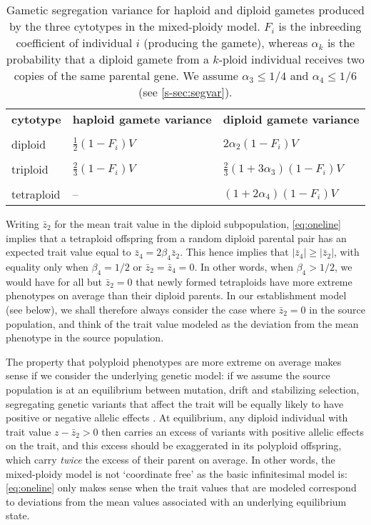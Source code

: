\documentclass[12pt,a4paper]{article}
\begin{document}
\begin{table}[t]
\caption{Gametic segregation variance for haploid and diploid gametes produced
by the three cytotypes in the mixed-ploidy model. $F_i$ is the inbreeding
coefficient of individual $i$ (producing the gamete), whereas $\alpha_k$ is the
probability that a diploid gamete from a $k$-ploid individual receives two
copies of the same parental gene. We assume $\alpha_3 \le 1/4$ and
    $\alpha_4 \le 1/6$ (see \cref{s-sec:segvar}).
} \label{tbl:segvar}
\centering
\small
\begin{tabularx}{\linewidth}{XXX}
\cline{1-3}
\textbf{cytotype}   & \textbf{haploid gamete variance} & \textbf{diploid gamete
variance}        \\ \cline{1-3} \\[-2.5ex]
diploid    & $\frac{1}{2}(1-F_i)V$    & $2\alpha_2(1-F_i)V$  \\ \\[-2.5ex]
triploid   & $\frac{2}{3}(1-F_i)V$     & $\frac{2}{3}(1 + 3\alpha_3)(1-F_i)V$ \\ \\[-2.5ex]
tetraploid & --                      & $(1+2\alpha_4)(1-F_i)V$             \\
\cline{1-3}
\end{tabularx}%
\end{table}

Writing $\bar{z}_2$ for the mean trait value in the diploid subpopulation,
\cref{eq:oneline} implies that a tetraploid offspring from a random diploid
parental pair has an expected trait value equal to $\bar{z}_4 =
2\beta_4\bar{z}_2$.
This hence implies that $|\bar{z}_4| \ge |\bar{z}_2|$, with equality only when
$\beta_4=1/2$ or $\bar{z}_2 = \bar{z}_4 = 0$. 
In other words, when $\beta_4 > 1/2$, we would have for all but $\bar{z}_2 = 0$
that newly formed tetraploids have more extreme phenotypes on average than
their diploid parents.
In our establishment model (see below), we shall therefore always consider 
the case where $\bar{z}_2=0$ in the source population, and think of the trait
value modeled as the deviation from the mean phenotype in the source
population.

The property that polyploid phenotypes are more extreme on average makes sense
if we consider the underlying genetic model: if we assume the source population
is at an equilibrium between mutation, drift and stabilizing selection,
segregating genetic variants that affect the trait will be equally likely to
have positive or negative allelic effects \citep{hayward2022}.
At equilibrium, any diploid individual with trait value $z - \bar{z}_2 > 0$
then carries an excess of variants with positive allelic effects on the trait,
and this excess should be exaggerated in its polyploid offspring, which carry
\textit{twice} the excess of their parent on average.
In other words, the mixed-ploidy model is not `coordinate free' as the basic
infinitesimal model is: \cref{eq:oneline} only makes sense when the trait
values that are modeled correspond to deviations from the mean values
associated with an underlying equilibrium state.
\end{document}
